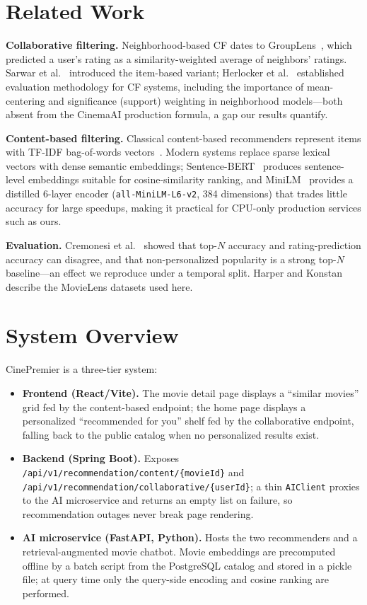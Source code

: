 \documentclass[conference]{IEEEtran}
\begin{document}
\section{Related Work}
\textbf{Collaborative filtering.} Neighborhood-based CF dates to
GroupLens~\cite{resnick1994grouplens}, which predicted a user's rating as a
similarity-weighted average of neighbors' ratings. Sarwar et
al.~\cite{sarwar2001item} introduced the item-based variant; Herlocker et
al.~\cite{herlocker2004evaluating} established evaluation methodology for CF
systems, including the importance of mean-centering and significance (support)
weighting in neighborhood models---both absent from the CinemaAI production
formula, a gap our results quantify.

\textbf{Content-based filtering.} Classical content-based recommenders
represent items with TF-IDF bag-of-words vectors~\cite{ricci2015handbook}.
Modern systems replace sparse lexical vectors with dense semantic embeddings;
Sentence-BERT~\cite{reimers2019sbert} produces sentence-level embeddings
suitable for cosine-similarity ranking, and MiniLM~\cite{wang2020minilm}
provides a distilled 6-layer encoder (\texttt{all-MiniLM-L6-v2}, 384
dimensions) that trades little accuracy for large speedups, making it practical
for CPU-only production services such as ours.

\textbf{Evaluation.} Cremonesi et al.~\cite{cremonesi2010performance} showed
that top-$N$ accuracy and rating-prediction accuracy can disagree, and that
non-personalized popularity is a strong top-$N$ baseline---an effect we
reproduce under a temporal split. Harper and
Konstan~\cite{harper2015movielens} describe the MovieLens datasets used here.

\section{System Overview}\label{sec:system}
CinePremier is a three-tier system:
\begin{itemize}
  \item \textbf{Frontend (React/Vite).} The movie detail page displays a
  ``similar movies'' grid fed by the content-based endpoint; the home page
  displays a personalized ``recommended for you'' shelf fed by the
  collaborative endpoint, falling back to the public catalog when no
  personalized results exist.
  \item \textbf{Backend (Spring Boot).} Exposes
  \texttt{/api/v1/recommendation/content/\{movieId\}} and
  \texttt{/api/v1/recommendation/collaborative/\{userId\}}; a thin
  \texttt{AIClient} proxies to the AI microservice and returns an empty list on
  failure, so recommendation outages never break page rendering.
  \item \textbf{AI microservice (FastAPI, Python).} Hosts the two recommenders
  and a retrieval-augmented movie chatbot. Movie embeddings are precomputed
  offline by a batch script from the PostgreSQL catalog and stored in a pickle
  file; at query time only the query-side encoding and cosine ranking are
  performed.
\end{itemize}
\end{document}
